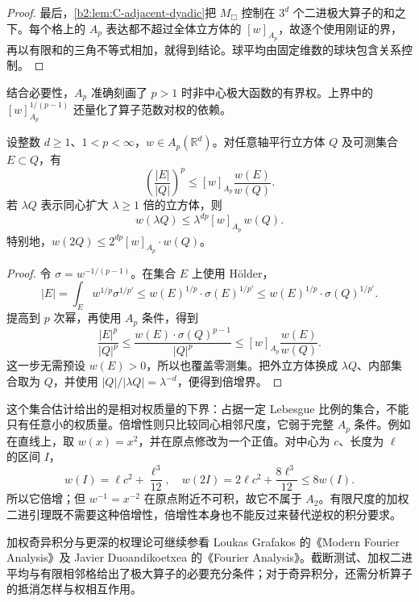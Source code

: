 \begin{proof}
最后，\cref{b2:lem:C-adjacent-dyadic}把 \(M_\mdlgwhtsquare\) 控制在
\(3^d\) 个二进极大算子的和之下。每个格上的 \(A_p\) 表达都不超过全体立方体的 \([w]_{A_p}\)，故逐个使用刚证的界，再以有限和的三角不等式相加，就得到结论。球平均由固定维数的球块包含关系控制。
\end{proof}

结合必要性，\(A_p\) 准确刻画了 \(p>1\) 时非中心极大函数的有界权。上界中的 \([w]_{A_p}^{1/(p-1)}\) 还量化了算子范数对权的依赖。

\begin{corollary}[权测度下界与倍增]
\label{b2:cor:C-ap-measure-control}
设整数 \(d\geq1\)、\(1<p<\infty\)，\(w\in A_p(\mathbb R^d)\)。对任意轴平行立方体 \(Q\) 及可测集合 \(E\subset Q\)，有
\[
 \left(\frac{|E|}{|Q|}\right)^p
       \leq[w]_{A_p}\frac{w(E)}{w(Q)}.
\]
若 \(\lambda Q\) 表示同心扩大 \(\lambda\geq1\) 倍的立方体，则
\[
 w(\lambda Q)
       \leq\lambda^{dp}[w]_{A_p}\,w(Q).
\]
特别地，\(w(2Q)\leq2^{dp}[w]_{A_p}\cdot w(Q)\)。
\end{corollary}
\begin{proof}
令 \(\sigma=w^{-1/(p-1)}\)。在集合 \(E\) 上使用 Hölder，
\[
 |E|
       =\int_Ew^{1/p}\sigma^{1/p'}
       \leq w(E)^{1/p}\cdot\sigma(E)^{1/p'}
       \leq w(E)^{1/p}\cdot\sigma(Q)^{1/p'}.
\]
提高到 \(p\) 次幂，再使用 \(A_p\) 条件，得到
\[
 \frac{|E|^p}{|Q|^p}
       \leq\frac{w(E)\cdot\sigma(Q)^{p-1}}{|Q|^p}
       \leq[w]_{A_p}\frac{w(E)}{w(Q)}.
\]
这一步无需预设 \(w(E)>0\)，所以也覆盖零测集。把外立方体换成
\(\lambda Q\)、内部集合取为 \(Q\)，并使用
\(|Q|/|\lambda Q|=\lambda^{-d}\)，便得到倍增界。
\end{proof}

这个集合估计给出的是相对权质量的下界：占据一定 Lebesgue 比例的集合，不能只有任意小的权质量。倍增性则只比较同心相邻尺度，它弱于完整 \(A_p\) 条件。例如在直线上，取 \(w(x)=x^2\)，并在原点修改为一个正值。对中心为 \(c\)、长度为 \(\ell\) 的区间 \(I\)，
\[
 w(I)=\ell c^2+\frac{\ell^3}{12},\quad
 w(2I)=2\ell c^2+\frac{8\ell^3}{12}\leq8w(I).
\]
所以它倍增；但 \(w^{-1}=x^{-2}\) 在原点附近不可积，故它不属于 \(A_2\)。有限尺度的加权二进引理既不需要这种倍增性，倍增性本身也不能反过来替代逆权的积分要求。

\ProseParagraphBreak

加权奇异积分与更深的权理论可继续参看 Loukas Grafakos 的《Modern Fourier Analysis》\cite{Grafakos2014Modern}及 Javier Duoandikoetxea 的《Fourier Analysis》\cite{Duoandikoetxea2001Fourier}。截断测试、加权二进平均与有限相邻格给出了极大算子的必要充分条件；对于奇异积分，还需分析算子的抵消怎样与权相互作用。


